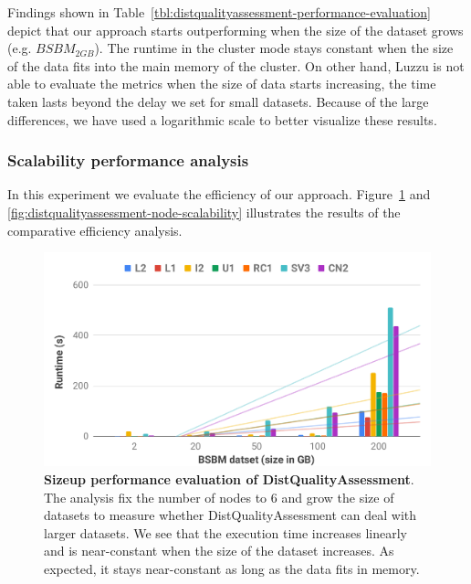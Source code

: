 Findings shown in Table~\ref{tbl:distqualityassessment-performance-evaluation} depict that our approach starts outperforming when the size of the dataset grows (e.g. $BSBM_{2GB}$).
The runtime in the cluster mode stays constant when the size of the data fits into the main memory of the cluster.
On other hand, Luzzu is not able to evaluate the metrics when the size of data starts increasing, the time taken lasts beyond the delay we set for small datasets. 
Because of the large differences, we have used a logarithmic scale to better visualize these results.

\subsubsection{Scalability performance analysis}
\label{subsubsection:distqualityassessment-scalability_performance}

In this experiment we evaluate the efficiency of our approach.
Figure~\ref{fig:distqualityassessment-sizeup-scalability} and \ref{fig:distqualityassessment-node-scalability} illustrates the results of the comparative efficiency analysis.

\begin{figure}
\centering
 \includegraphics[width=1.0\columnwidth]{images/5_distqualityassessment/distqualityassessment-sizeup-scalability.pdf}
    \caption{\textbf{Sizeup performance evaluation of DistQualityAssessment}.
    The analysis fix the number of nodes to 6 and grow the size of datasets to measure whether DistQualityAssessment can deal with larger datasets.
    We see that the execution time increases linearly and is near-constant when the size of the dataset increases. 
    As expected, it stays near-constant as long as the data fits in memory.}
    \label{fig:distqualityassessment-sizeup-scalability}
\end{figure}

